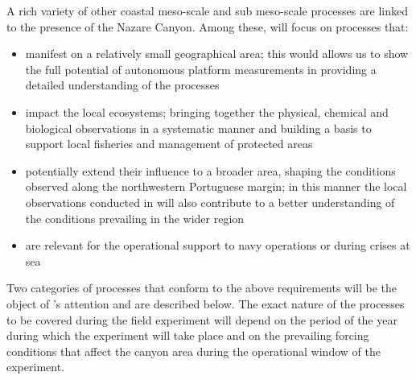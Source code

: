 A rich variety of other coastal meso-scale and sub meso-scale
processes are linked to the presence of the Nazare Canyon. Among these,
\proj will focus on processes that:

\begin{itemize}

\item manifest on a relatively small geographical area; this would
  allows us to show the full potential of autonomous platform
  measurements in providing a detailed understanding of the processes

\item impact the local ecosystems; bringing together the physical,
  chemical and biological observations in a systematic manner and
  building a basis to support local fisheries and management of
  protected areas

\item potentially extend their influence to a broader area, shaping
  the conditions observed along the northwestern Portuguese margin; in
  this manner the local observations conducted in \proj will also
  contribute to a better understanding of the conditions prevailing in
  the wider region

\item are relevant for the operational support to navy operations or
  during crises at sea

\end{itemize}  

 
Two categories of processes that conform to the above requirements
will be the object of \proje's attention and are described below. The
exact nature of the processes to be covered during the field
experiment will depend on the period of the year during which the
experiment will take place and on the prevailing forcing conditions
that affect the \naz canyon area during the operational window of the
experiment.

